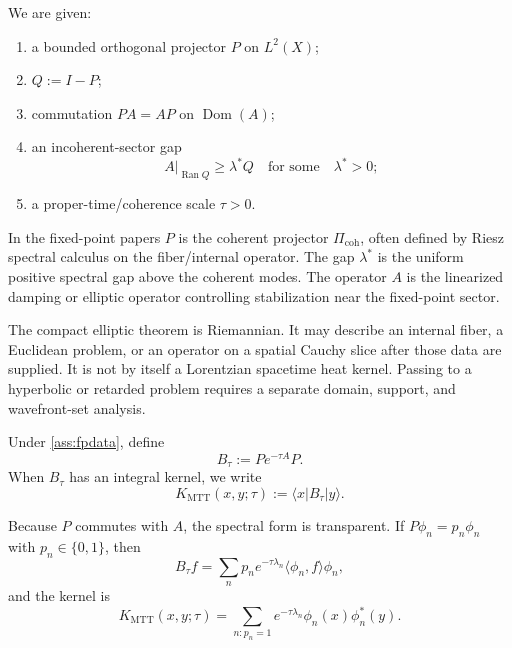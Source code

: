 \documentclass[11pt]{article}
\begin{document}
\begin{assumption}\label{ass:fpdata}
We are given:
\begin{enumerate}[label=(\roman*)]
\item a bounded orthogonal projector \(P\) on \(L^2(X)\);
\item \(Q:=I-P\);
\item commutation \(PA=AP\) on \(\operatorname{Dom}(A)\);
\item an incoherent-sector gap
\[
        A|_{\operatorname{Ran}Q}\ge \lambda^\ast Q
        \quad\text{for some}\quad \lambda^\ast>0;
\]
\item a proper-time/coherence scale \(\tau>0\).
\end{enumerate}
\end{assumption}

\begin{remark}
In the fixed-point papers \(P\) is the coherent projector \(\Pi_{\mathrm{coh}}\), often defined by
Riesz spectral calculus on the fiber/internal operator. The gap \(\lambda^\ast\) is the uniform
positive spectral gap above the coherent modes. The operator \(A\) is the linearized damping
or elliptic operator controlling stabilization near the fixed-point sector.
\end{remark}

\begin{remark}\label{rem:typing}
The compact elliptic theorem is Riemannian.  It may describe an internal
fiber, a Euclidean problem, or an operator on a spatial Cauchy slice after
those data are supplied.  It is not by itself a Lorentzian spacetime heat
kernel.  Passing to a hyperbolic or retarded problem requires a separate
domain, support, and wavefront-set analysis.
\end{remark}

\begin{definition}\label{def:Btau}
Under \cref{ass:fpdata}, define
\[
        B_\tau:=P e^{-\tau A}P .
\]
When \(B_\tau\) has an integral kernel, we write
\[
        K_{\mathrm{MTT}}(x,y;\tau)
        :=
        \langle x|B_\tau|y\rangle .
\]
\end{definition}

Because \(P\) commutes with \(A\), the spectral form is transparent. If \(P\phi_n=p_n\phi_n\)
with \(p_n\in\{0,1\}\), then
\[
        B_\tau f
        =
        \sum_{n}p_n e^{-\tau\lambda_n}\langle \phi_n,f\rangle\phi_n,
\]
and the kernel is
\[
        K_{\mathrm{MTT}}(x,y;\tau)
        =
        \sum_{n:p_n=1}
        e^{-\tau\lambda_n}\phi_n(x)\phi_n^\ast(y).
\]
\end{document}
